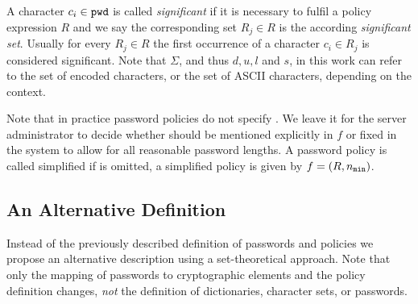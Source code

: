 \noindent
A character $c_i\in\mathtt{pwd}$ is called \emph{significant} if it is necessary to fulfil a policy expression $R$ and we say the corresponding set $R_j\in R$ is the according \emph{significant set}.
Usually for every $R_j\in R$ the first occurrence of a character $c_i\in R_j$ is considered significant.
Note that $\Sigma$, and thus $d,u,l$ and $s$, in this work can refer to the set of encoded characters, or the set of \ac{ASCII}  characters, depending on the context.

\begin{remark}
Note that in practice password policies do not specify \pmax. 
We leave it for the server administrator to decide whether \pmax should be mentioned explicitly in $f$ or fixed in the system to allow for all reasonable password lengths.
A password policy is called simplified if \pmax is omitted, \ie a simplified policy is given by $f=(R,{n_\mathtt{min}})$.
\end{remark}


\subsection{An Alternative Definition}\label{sec:spc-passwords}
Instead of the previously described definition of passwords and policies we propose an alternative description using a set-theoretical approach.
Note that only the mapping of passwords to cryptographic elements and the policy definition changes, \emph{not} the definition of dictionaries, character sets, or passwords.

